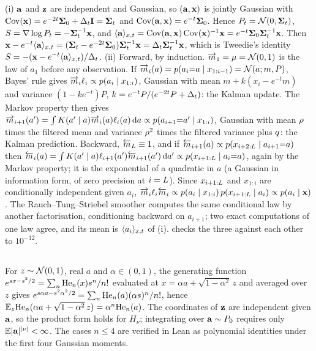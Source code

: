 \subsection{}
(i) $\mathbf{a}$ and $\mathbf{z}$ are independent and Gaussian, so $(\mathbf{a},\mathbf{x})$ is jointly Gaussian with
$\operatorname{Cov}(\mathbf{x})=e^{-2t}\mathbf{\Sigma}_0+\Delta_t\mathbf{I}=\mathbf{\Sigma}_t$ and $\operatorname{Cov}(\mathbf{a},\mathbf{x})=e^{-t}\mathbf{\Sigma}_0$. Hence
$P_t=\mathcal{N}\!\left(0,\mathbf{\Sigma}_t\right)$, $S=\nabla\log P_t=-\mathbf{\Sigma}_t^{-1}\mathbf{x}$, and
$\langle \mathbf{a} \rangle_{x,t}=\operatorname{Cov}(\mathbf{a},\mathbf{x})\operatorname{Cov}(\mathbf{x})^{-1}\mathbf{x}=e^{-t}\mathbf{\Sigma}_0\mathbf{\Sigma}_t^{-1}\mathbf{x}$. Then
$\mathbf{x}-e^{-t}\langle \mathbf{a} \rangle_{x,t}=(\mathbf{\Sigma}_t-e^{-2t}\mathbf{\Sigma}_0)\mathbf{\Sigma}_t^{-1}\mathbf{x}=\Delta_t\mathbf{\Sigma}_t^{-1}\mathbf{x}$, which is
Tweedie's identity $S=-(\mathbf{x}-e^{-t}\langle \mathbf{a} \rangle_{x,t})/\Delta_t$.
(ii) Forward, by induction. $\overrightarrow{m}_1=\mu=\mathcal{N}\!\left(0,1\right)$ is the law of $a_1$ before any
observation. If $\overrightarrow{m}_i(a)=p(a_i{=}a\mid x_{1:i-1})=\mathcal N(a;m,P)$, Bayes' rule gives
$\overrightarrow{m}_i\ell_i\propto p(a_i\mid x_{1:i})$, Gaussian with mean $m+k(x_i-e^{-t}m)$ and variance
$(1-ke^{-t})P$, $k=e^{-t}P/(e^{-2t}P+\Delta_t)$: the Kalman update. The Markov property then gives
$\overrightarrow{m}_{i+1}(a')=\int K(a'\mid a)\overrightarrow{m}_i(a)\ell_i(a)\,\mathrm{d} a\propto p(a_{i+1}{=}a'\mid x_{1:i})$,
Gaussian with mean $\rho$ times the filtered mean and variance $\rho^2$ times the filtered
variance plus $q$: the Kalman prediction. Backward, $\overleftarrow{m}_{L}\equiv1$, and if
$\overleftarrow{m}_{i+1}(a)\propto p(x_{i+2:L}\mid a_{i+1}{=}a)$ then
$\overleftarrow{m}_i(a)=\int K(a'\mid a)\ell_{i+1}(a')\overleftarrow{m}_{i+1}(a')\,\mathrm{d} a'\propto
p(x_{i+1:L}\mid a_i{=}a)$, again by the Markov property; it is the exponential of a
quadratic in $a$ (a Gaussian in information form, of zero precision at $i=L$). Since
$x_{i+1:L}$ and $x_{1:i}$ are conditionally independent given $a_i$,
$\overrightarrow{m}_i\ell_i\overleftarrow{m}_i\propto p(a_i\mid x_{1:i})\,p(x_{i+1:L}\mid a_i)\propto
p(a_i\mid\mathbf{x})$. The Rauch--Tung--Striebel smoother computes the same conditional law by another
factorisation, conditioning backward on $a_{i+1}$; two exact computations of one law agree, and
its mean is $\langle a_i \rangle_{x,t}$ of (i).  checks the three against each
other to $10^{-12}$.

\subsection{}
For $z\sim\mathcal{N}\!\left(0,1\right)$, real $a$ and $\alpha\in(0,1)$, the
generating function $e^{sx-s^2/2}=\sum_n\mathrm{He}_{n}(x)s^n/n!$ evaluated at
$x=\alpha a+\sqrt{1-\alpha^2}\,z$ and averaged over $z$ gives
$e^{s\alpha a-s^2\alpha^2/2}=\sum_n\mathrm{He}_{n}(a)(\alpha s)^n/n!$, hence
$\mathbb{E}_z\mathrm{He}_{n}(\alpha a+\sqrt{1-\alpha^2}\,z)=\alpha^n\mathrm{He}_{n}(a)$. The coordinates of $\mathbf{z}$ are
independent given $\mathbf{a}$, so the product form holds for $H_\nu$; integrating over
$\mathbf{a}\sim P_0$ requires only $\mathbb{E}|\mathbf{a}|^{|\nu|}<\infty$. The cases $n\le4$ are verified in
Lean as polynomial identities under the first four Gaussian moments.

